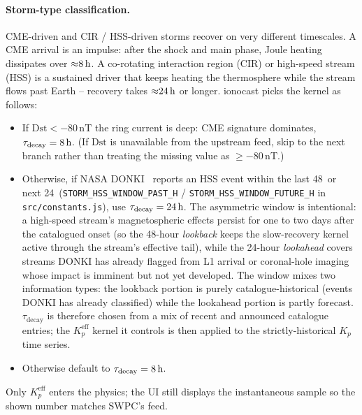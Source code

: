 \documentclass[11pt,a4paper]{article}
\newcommand{\SI}[2]{#1\,\text{#2}}
\newcommand{\hour}{\text{h}}
\begin{document}
\paragraph{Storm-type classification.}  CME-driven and CIR / HSS-driven
storms recover on very different timescales.  A CME arrival is an
impulse: after the shock and main phase, Joule heating dissipates
over ${\approx}\SI{8}{\hour}$.  A co-rotating interaction region
(CIR) or high-speed stream (HSS) is a sustained driver that keeps
heating the thermosphere while the stream flows past Earth -- recovery
takes ${\approx}\SI{24}{\hour}$ or longer.  ionocast picks the kernel
as follows:
\begin{itemize}[nosep]
  \item If $\text{Dst} < -\SI{80}{nT}$ the ring current is deep: CME
        signature dominates, $\tau_{\text{decay}} = \SI{8}{\hour}$.
        (If $\text{Dst}$ is unavailable from the upstream feed,
        skip to the next branch rather than treating the missing
        value as $\geq -\SI{80}{nT}$.)
  \item Otherwise, if NASA DONKI~\cite{donki} reports an HSS event within the last
        \SI{48}{\hour} or next \SI{24}{\hour}
        (\texttt{STORM\_HSS\_WINDOW\_PAST\_H} /
        \texttt{STORM\_HSS\_WINDOW\_FUTURE\_H} in
        \texttt{src/constants.js}), use
        $\tau_{\text{decay}} = \SI{24}{\hour}$.  The asymmetric
        window is intentional: a high-speed stream's
        magnetospheric effects persist for one to two days after
        the catalogued onset (so the 48-hour \emph{lookback}
        keeps the slow-recovery kernel active through the
        stream's effective tail), while the 24-hour
        \emph{lookahead} covers streams DONKI has already flagged
        from L1 arrival or coronal-hole imaging whose impact is
        imminent but not yet developed.  The window mixes two
        information types: the lookback portion is purely
        catalogue-historical (events DONKI has already
        classified) while the lookahead
        portion is partly forecast.  $\tau_{\text{decay}}$ is
        therefore chosen from a
        mix of recent and announced catalogue entries; the
        $K_p^{\text{eff}}$ kernel it controls is then applied to
        the strictly-historical $K_p$ time series.
  \item Otherwise default to $\tau_{\text{decay}} = \SI{8}{\hour}$.
\end{itemize}
Only $K_p^{\text{eff}}$ enters the physics; the UI still displays the
instantaneous sample so the shown number matches SWPC's feed.
\end{document}
